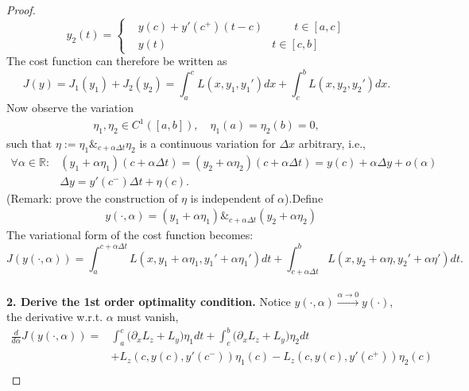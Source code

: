 \documentclass[a4paper,11pt,fleqn]{book}
\theoremstyle{definition}
\theoremstyle{remark}
\begin{document}
\begin{proof}
\begin{equation*}
y_2(t) = \left\{
\begin{aligned}
	    &y(c) + y'(c^+)(t - c) &\qquad t \in [a, c]\\
	 		&  y(t) & t\in [c, b]
\end{aligned}
\right.
\end{equation*}
The cost function can therefore be written as 
\begin{equation*}
	J(y) = J_1(y_1) + J_2(y_2) 
	= \int_a^c L(x, y_1, y_1') dx + \int_c^b L(x, y_2, y_2') dx. 
\end{equation*} 
Now observe the variation 
\begin{align*}
	\eta_1, \eta_2 \in C^1([a, b]), \quad \eta_1(a) = \eta_2(b) = 0,
\end{align*}
such that $ \eta:= \eta_1 \&_{c + \alpha \Delta t} \eta_2$ is a continuous variation for $\Delta x$ arbitrary, i.e.,  
\begin{equation}
\begin{aligned}
	\forall \alpha \in \mathbb{R}: & (y_1 + \alpha \eta_1)(c + \alpha \Delta t) = (y_2+ \alpha \eta_2) (c + \alpha \Delta t) = y(c) + \alpha \Delta y + o(\alpha)\\
	& \Delta y = y'(c^-) \Delta t + \eta(c). 
\end{aligned}
\end{equation}
(Remark: prove the construction of $\eta$ is independent of $\alpha$).Define
\begin{align*}
	& y(\cdot, \alpha) = (y_1 + \alpha \eta_1) \&_{c + \alpha \Delta t} (y_2 + \alpha \eta_2)
\end{align*}
The variational form of the cost function becomes:
\begin{equation}
	J(y(\cdot, \alpha)) = \int_a^{c + \alpha\Delta t} L(x, y_1 + \alpha\eta_1, y_1' +\alpha\eta_1')dt + \int_{c + \alpha\Delta t}^b L(x, y_2 + \alpha\eta, y_2' + \alpha\eta')dt.
\end{equation}
\quad\\
\textbf{2. Derive the 1st order optimality condition.} 
Notice $y(\cdot, \alpha) \overset{\alpha \rightarrow 0}{\longrightarrow} y(\cdot)$, the derivative w.r.t. $\alpha$ must vanish, 
\begin{align*}
	\frac{d}{d\alpha}  J(y(\cdot, \alpha) ) = &
	\int_a^c \bigg(\partial_xL_z + L_y\bigg)\eta_1 dt + \int_c^b \bigg(\partial_x L_z + L_y\bigg)\eta_2dt \\
	& +L_z(c, y(c), y'(c^-))\eta_1(c) - L_z(c, y(c), y'(c^+))\eta_2(c)\\ 

\end{align*}
\end{proof}
\end{document}
